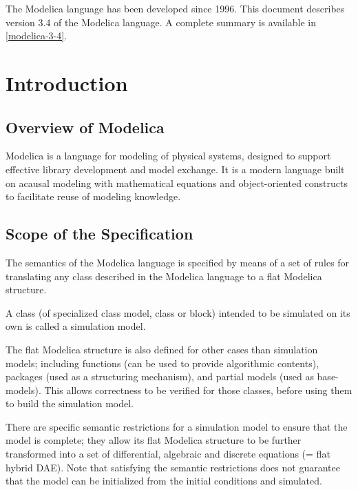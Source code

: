 \documentclass[10pt,a4paper]{report}
\def\doublelabel#1{\label{#1}\hypertarget{#1}{}}
\begin{document}
The Modelica language has been developed since 1996. This document
describes version 3.4 of the Modelica language. A complete summary is
available in \ref{modelica-3-4}.

\chapter{Introduction}\doublelabel{introduction1}
\section{Overview of Modelica}\doublelabel{overview-of-modelica}
Modelica is a language for modeling of physical systems, designed to
support effective library development and model exchange. It is a modern
language built on acausal modeling with mathematical equations and
object-oriented constructs to facilitate reuse of modeling knowledge.

\section{Scope of the Specification}\doublelabel{scope-of-the-specification}

The semantics of the Modelica language is specified by means of a set of
rules for translating any class described in the Modelica language to a
flat Modelica structure.

A class (of specialized class model, class or block) intended to be
simulated on its own is called a simulation model.

The flat Modelica structure is also defined for other cases than
simulation models; including functions (can be used to provide
algorithmic contents), packages (used as a structuring mechanism), and
partial models (used as base-models). This allows correctness to be
verified for those classes, before using them to build the simulation
model.

There are specific semantic restrictions for a simulation model to
ensure that the model is complete; they allow its flat Modelica
structure to be further transformed into a set of differential,
algebraic and discrete equations (= flat hybrid DAE). Note that
satisfying the semantic restrictions does not guarantee that the model
can be initialized from the initial conditions and simulated.
\end{document}
